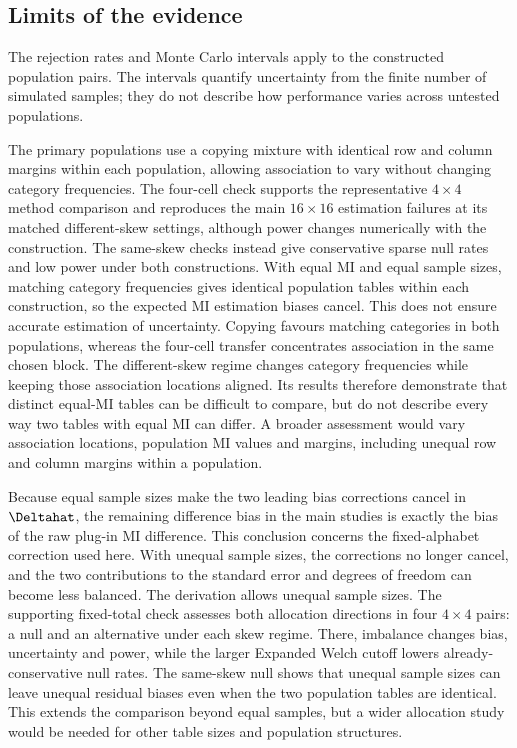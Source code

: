 \begin{samepage}
\section{Limits of the evidence}

The rejection rates and Monte Carlo intervals apply to the constructed
population pairs. The intervals quantify uncertainty from the finite number
of simulated samples; they do not describe how performance varies across
untested populations.
\par
\end{samepage}

The primary populations use a copying mixture with identical row and
column margins within each population, allowing association to vary
without changing category frequencies. The four-cell check
supports the representative \(4\times4\) method comparison and
reproduces the main \(16\times16\) estimation failures at its matched
different-skew settings, although power changes numerically with the construction.
The same-skew checks instead give conservative sparse null rates and low
power under both constructions. With equal MI and equal sample sizes,
matching category frequencies gives identical population tables within
each construction, so the expected MI estimation biases cancel. This does
not ensure accurate estimation of uncertainty.
Copying favours matching categories in both
populations, whereas the four-cell transfer concentrates association
in the same chosen block. The different-skew regime changes category
frequencies while keeping those association locations aligned. Its
results therefore demonstrate that distinct equal-MI tables can be
difficult to compare, but do not describe every way two tables with
equal MI can differ. A broader assessment would vary association
locations, population MI values and margins, including unequal
row and column margins within a population.

Because equal sample sizes make the two leading bias corrections cancel
in \(\Deltahat\), the remaining difference bias in the main studies
is exactly the bias of the raw plug-in MI difference. This conclusion
concerns the fixed-alphabet correction used here. With unequal sample sizes, the
corrections no longer cancel, and the two contributions to the standard
error and degrees of freedom can become less balanced. The derivation
allows unequal sample sizes. The supporting fixed-total check assesses
both allocation directions in four \(4\times4\) pairs: a null and an
alternative under each skew regime.
There, imbalance changes bias, uncertainty and power, while the
larger Expanded Welch cutoff lowers already-conservative null rates.
The same-skew null shows that unequal sample sizes can leave unequal
residual biases even when the two population tables are identical.
This extends the comparison beyond equal samples, but a wider allocation
study would be needed for other table sizes and population structures.

